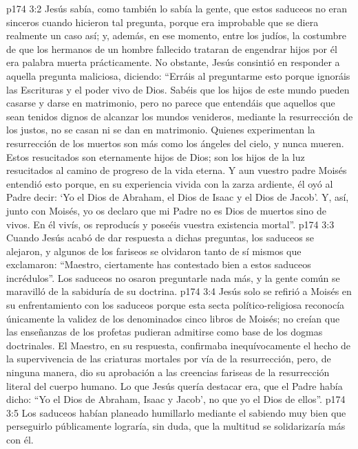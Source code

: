 \vs p174 3:2 Jesús sabía, como también lo sabía la gente, que estos saduceos no eran sinceros cuando hicieron tal pregunta, porque era improbable que se diera realmente un caso así; y, además, en ese momento, entre los judíos, la costumbre de que los hermanos de un hombre fallecido trataran de engendrar hijos por él era palabra muerta prácticamente. No obstante, Jesús consintió en responder a aquella pregunta maliciosa, diciendo: “Erráis al preguntarme esto porque ignoráis las Escrituras y el poder vivo de Dios. Sabéis que los hijos de este mundo pueden casarse y darse en matrimonio, pero no parece que entendáis que aquellos que sean tenidos dignos de alcanzar los mundos venideros, mediante la resurrección de los justos, no se casan ni se dan en matrimonio. Quienes experimentan la resurrección de los muertos son más como los ángeles del cielo, y nunca mueren. Estos resucitados son eternamente hijos de Dios; son los hijos de la luz resucitados al camino de progreso de la vida eterna. Y aun vuestro padre Moisés entendió esto porque, en su experiencia vivida con la zarza ardiente, él oyó al Padre decir: ‘Yo  el Dios de Abraham, el Dios de Isaac y el Dios de Jacob’. Y, así, junto con Moisés, yo os declaro que mi Padre no es Dios de muertos sino de vivos. En él vivís, os reproducís y poseéis vuestra existencia mortal”.
\vs p174 3:3 Cuando Jesús acabó de dar respuesta a dichas preguntas, los saduceos se alejaron, y algunos de los fariseos se olvidaron tanto de sí mismos que exclamaron: “Maestro, ciertamente has contestado bien a estos saduceos incrédulos”. Los saduceos no osaron preguntarle nada más, y la gente común se maravilló de la sabiduría de su doctrina.
\vs p174 3:4 \pc Jesús solo se refirió a Moisés en su enfrentamiento con los saduceos porque esta secta político\hyp{}religiosa reconocía únicamente la validez de los denominados cinco libros de Moisés; no creían que las enseñanzas de los profetas pudieran admitirse como base de los dogmas doctrinales. El Maestro, en su respuesta, confirmaba inequívocamente el hecho de la supervivencia de las criaturas mortales por vía de la resurrección, pero, de ninguna manera, dio su aprobación a las creencias fariseas de la resurrección literal del cuerpo humano. Lo que Jesús quería destacar era, que el Padre había dicho: “Yo  el Dios de Abraham, Isaac y Jacob’, no que yo  el Dios de ellos”.
\vs p174 3:5 Los saduceos habían planeado humillarlo mediante el  sabiendo muy bien que perseguirlo públicamente lograría, sin duda, que la multitud se solidarizaría más con él.
